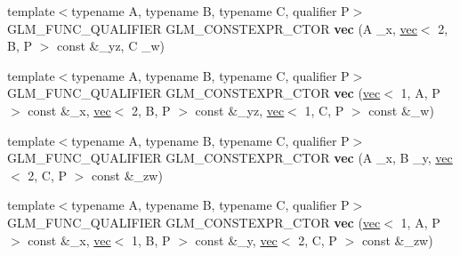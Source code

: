 \begin{DoxyCompactItemize}
\item 
\mbox{\label{structglm_1_1vec_3_014_00_01T_00_01Q_01_4_a4e0096b6a4a96926e0ab495f3cb52403}} 
{\footnotesize template$<$typename A, typename B, typename C, qualifier P$>$ }\\G\+L\+M\+\_\+\+F\+U\+N\+C\+\_\+\+Q\+U\+A\+L\+I\+F\+I\+ER G\+L\+M\+\_\+\+C\+O\+N\+S\+T\+E\+X\+P\+R\+\_\+\+C\+T\+OR {\bfseries vec} (A \+\_\+x, \hyperlink{structglm_1_1vec}{vec}$<$ 2, B, P $>$ const \&\+\_\+yz, C \+\_\+w)
\item 
\mbox{\label{structglm_1_1vec_3_014_00_01T_00_01Q_01_4_ad25742ead79d7c154707dcb1d6c9488d}} 
{\footnotesize template$<$typename A, typename B, typename C, qualifier P$>$ }\\G\+L\+M\+\_\+\+F\+U\+N\+C\+\_\+\+Q\+U\+A\+L\+I\+F\+I\+ER G\+L\+M\+\_\+\+C\+O\+N\+S\+T\+E\+X\+P\+R\+\_\+\+C\+T\+OR {\bfseries vec} (\hyperlink{structglm_1_1vec}{vec}$<$ 1, A, P $>$ const \&\+\_\+x, \hyperlink{structglm_1_1vec}{vec}$<$ 2, B, P $>$ const \&\+\_\+yz, \hyperlink{structglm_1_1vec}{vec}$<$ 1, C, P $>$ const \&\+\_\+w)
\item 
\mbox{\label{structglm_1_1vec_3_014_00_01T_00_01Q_01_4_ad157b736479c1663d886b63c5992c10e}} 
{\footnotesize template$<$typename A, typename B, typename C, qualifier P$>$ }\\G\+L\+M\+\_\+\+F\+U\+N\+C\+\_\+\+Q\+U\+A\+L\+I\+F\+I\+ER G\+L\+M\+\_\+\+C\+O\+N\+S\+T\+E\+X\+P\+R\+\_\+\+C\+T\+OR {\bfseries vec} (A \+\_\+x, B \+\_\+y, \hyperlink{structglm_1_1vec}{vec}$<$ 2, C, P $>$ const \&\+\_\+zw)
\item 
\mbox{\label{structglm_1_1vec_3_014_00_01T_00_01Q_01_4_ab16d5c7c6e22f08e197088a9535a114b}} 
{\footnotesize template$<$typename A, typename B, typename C, qualifier P$>$ }\\G\+L\+M\+\_\+\+F\+U\+N\+C\+\_\+\+Q\+U\+A\+L\+I\+F\+I\+ER G\+L\+M\+\_\+\+C\+O\+N\+S\+T\+E\+X\+P\+R\+\_\+\+C\+T\+OR {\bfseries vec} (\hyperlink{structglm_1_1vec}{vec}$<$ 1, A, P $>$ const \&\+\_\+x, \hyperlink{structglm_1_1vec}{vec}$<$ 1, B, P $>$ const \&\+\_\+y, \hyperlink{structglm_1_1vec}{vec}$<$ 2, C, P $>$ const \&\+\_\+zw)
\item 
\mbox{\label{structglm_1_1vec_3_014_00_01T_00_01Q_01_4_adf93c96aee6aa7910fb218b3d0cb8697}} 

\end{DoxyCompactItemize}
